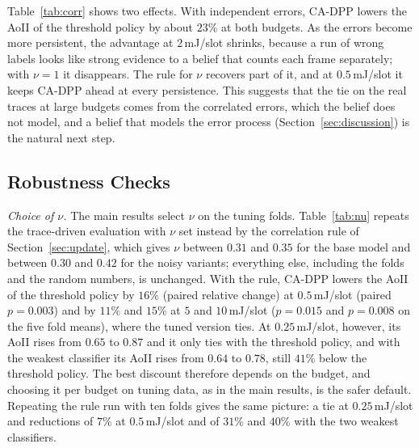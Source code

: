 \documentclass[5p,twocolumn]{elsarticle}
\theoremstyle{remark}
\begin{document}
Table~\ref{tab:corr} shows two effects. With independent errors, CA-DPP lowers the AoII of the threshold policy by about $23\%$ at both budgets. As the errors become more persistent, the advantage at $2$\,mJ/slot shrinks, because a run of wrong labels looks like strong evidence to a belief that counts each frame separately; with $\nu=1$ it disappears. The rule for $\nu$ recovers part of it, and at $0.5$\,mJ/slot it keeps CA-DPP ahead at every persistence. This suggests that the tie on the real traces at large budgets comes from the correlated errors, which the belief does not model, and a belief that models the error process (Section~\ref{sec:discussion}) is the natural next step.

\subsection{Robustness Checks}\label{res:robust}
\emph{Choice of $\nu$.} The main results select $\nu$ on the tuning folds. Table~\ref{tab:nu} repeats the trace-driven evaluation with $\nu$ set instead by the correlation rule of Section~\ref{sec:update}, which gives $\nu$ between $0.31$ and $0.35$ for the base model and between $0.30$ and $0.42$ for the noisy variants; everything else, including the folds and the random numbers, is unchanged. With the rule, CA-DPP lowers the AoII of the threshold policy by $16\%$ (paired relative change) at $0.5$\,mJ/slot (paired $p=0.003$) and by $11\%$ and $15\%$ at $5$ and $10$\,mJ/slot ($p=0.015$ and $p=0.008$ on the five fold means), where the tuned version ties. At $0.25$\,mJ/slot, however, its AoII rises from $0.65$ to $0.87$ and it only ties with the threshold policy, and with the weakest classifier its AoII rises from $0.64$ to $0.78$, still $41\%$ below the threshold policy. The best discount therefore depends on the budget, and choosing it per budget on tuning data, as in the main results, is the safer default. Repeating the rule run with ten folds gives the same picture: a tie at $0.25$\,mJ/slot and reductions of $7\%$ at $0.5$\,mJ/slot and of $31\%$ and $40\%$ with the two weakest classifiers.
\end{document}
